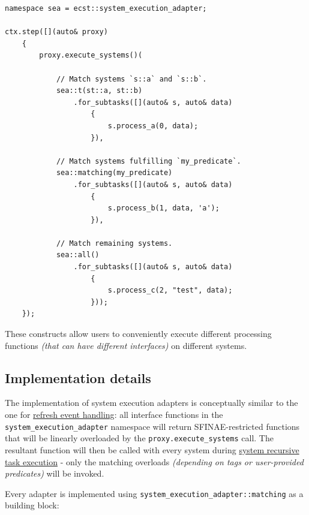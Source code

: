 \documentclass[twoside, 12pt, a4paper, openright]{book}
\begin{document}
\begin{verbatim}
namespace sea = ecst::system_execution_adapter;

ctx.step([](auto& proxy)
    {
        proxy.execute_systems()(

            // Match systems `s::a` and `s::b`.
            sea::t(st::a, st::b)
                .for_subtasks([](auto& s, auto& data)
                    {
                        s.process_a(0, data);
                    }),

            // Match systems fulfilling `my_predicate`.
            sea::matching(my_predicate)
                .for_subtasks([](auto& s, auto& data)
                    {
                        s.process_b(1, data, 'a');
                    }),

            // Match remaining systems.
            sea::all()
                .for_subtasks([](auto& s, auto& data)
                    {
                        s.process_c(2, "test", data);
                    }));
    });
\end{verbatim}

These constructs allow users to conveniently execute different
processing functions \emph{(that can have different interfaces)} on
different systems.

\subsection{Implementation details}\label{implementation-details-2}

The implementation of system execution adapters is conceptually similar
to the one for \protect\hyperlink{advf_refresh_event_handling}{refresh
event handling}: all interface functions in the
\texttt{system_execution_adapter}
namespace will return SFINAE-restricted functions that will be linearly
overloaded by the
\texttt{proxy.execute_systems}
call. The resultant function will then be called with every system
during
\protect\hyperlink{multithreading_recursive_task_execution}{system
recursive task execution} - only the matching overloads \emph{(depending
on tags or user-provided predicates)} will be invoked.

Every adapter is implemented using
\texttt{system_execution_adapter::matching}
as a building block:
\end{document}

